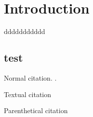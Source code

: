 \chapter{Introduction}
\label{Introduction}

ddddddddddd

\section{test}

Normal citation. \cite{2020_what_happens_to_bert_embeddings_during_finetuning, fbetascore}.

Textual citation \textcite{BioMedicalBERT_ALBERT_ELECTRA_2021,kim-etal-2019-categorical_metadata_text_classification}

Parenthetical citation \parencite{BioNER_with_multilingualBERT_2019, model_cards_for_model_reporting}
